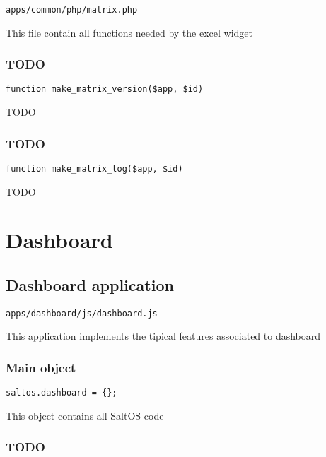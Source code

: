 \documentclass[a4paper]{article}
\begin{document}
\begin{lstlisting}
apps/common/php/matrix.php
\end{lstlisting}

This file contain all functions needed by the excel widget

\hypertarget{toc35}{}
\subsubsection{TODO}

\begin{lstlisting}
function make_matrix_version($app, $id)
\end{lstlisting}

TODO

\hypertarget{toc36}{}
\subsubsection{TODO}

\begin{lstlisting}
function make_matrix_log($app, $id)
\end{lstlisting}

TODO


\hypertarget{toc37}{}
\section{Dashboard}

\hypertarget{toc38}{}
\subsection{Dashboard application}

\begin{lstlisting}
apps/dashboard/js/dashboard.js
\end{lstlisting}

This application implements the tipical features associated to dashboard

\hypertarget{toc39}{}
\subsubsection{Main object}

\begin{lstlisting}
saltos.dashboard = {};
\end{lstlisting}

This object contains all SaltOS code

\hypertarget{toc40}{}
\subsubsection{TODO}
\end{document}
